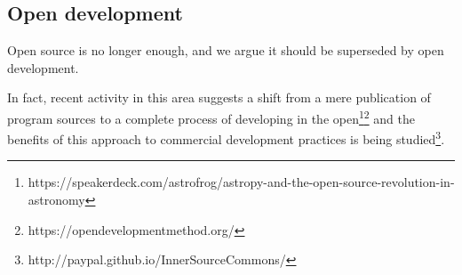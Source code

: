 \subsection{Open development}

Open source is no longer enough, and we argue it should be superseded by open development.

In fact, recent activity in this area suggests a shift from a mere publication of program sources to a complete process of developing in the open\footnote{https://speakerdeck.com/astrofrog/astropy-and-the-open-source-revolution-in-astronomy}\footnote{https://opendevelopmentmethod.org/} and the benefits of this approach to commercial development practices is being studied\footnote{http://paypal.github.io/InnerSourceCommons/}.
